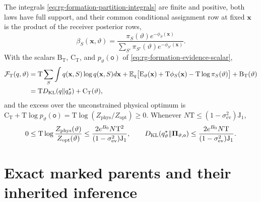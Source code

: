 The integrals \cref{eq:rg-formation-partition-integrals} are finite and
positive, both laws have full support, and their common conditional
assignment row at fixed \(\mathbf x\) is the product of the receiver posterior
rows,
\begin{equation}
\beta_S(\mathbf x,\vartheta)=
\frac{\pi_S(\vartheta)e^{-\phi_S(\mathbf x)}}
     {\sum_{S'}\pi_{S'}(\vartheta)e^{-\phi_{S'}(\mathbf x)}}.
\label{eq:rg-formation-full-source-row}
\end{equation}
With the scalars \(\mathrm B_{\mathrm T}\), \(\mathrm C_{\mathrm T}\), and
\(p_\vartheta(\mathsf o)\) of \cref{eq:rg-formation-evidence-scalar},
\begin{equation}
\begin{aligned}
\mathcal F_{\mathrm T}(q,\vartheta)
 &=\mathrm T\sum_S\int q(\mathbf x,S)\log q(\mathbf x,S) d\mathbf x
  +\mathbb E_q\bigl[\mathrm E_\vartheta(\mathbf x)+\mathrm T\phi_S(\mathbf x)
       -\mathrm T\log\pi_S(\vartheta)\bigr]
       +\mathrm B_{\mathrm T}(\vartheta)\\
 &=\mathrm TD_{\mathrm{KL}}(q\Vert q^\star_\vartheta)+\mathrm C_{\mathrm T}(\vartheta),
\end{aligned}
\label{eq:rg-formation-restricted-vfe}
\end{equation}
and the excess over the unconstrained physical optimum is
\(\mathrm C_{\mathrm T}+\mathrm T\log p_\vartheta(\mathsf o)
=\mathrm T\log(Z_{\mathrm{phys}}/Z_{\mathrm{opt}})\ge0\). Whenever
\(N\mathrm T\le(1-\sigma^2_{\mathrm{ev}})\mathrm J_1\),
\begin{equation}
0\le\mathrm T\log\frac{Z_{\mathrm{phys}}(\vartheta)}{Z_{\mathrm{opt}}(\vartheta)}
\le\frac{2e^{B_0}N\mathrm T^2}{(1-\sigma^2_{\mathrm{ev}})\mathrm J_1},
\qquad
D_{\mathrm{KL}}(q^\star_\vartheta\Vert\boldsymbol\Pi_{\vartheta,\mathsf o})
\le\frac{2e^{B_0}N\mathrm T}{(1-\sigma^2_{\mathrm{ev}})\mathrm J_1}.
\label{eq:rg-formation-physical-optimizer-gap}
\end{equation}

\section{Exact marked parents and their inherited inference}
\label{sec:rg-formation-parents}

